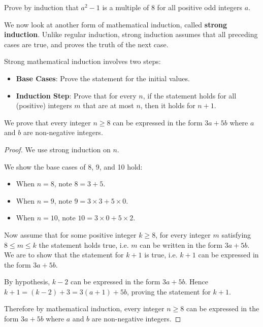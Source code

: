 \begin{exercise}
    Prove by induction that $a^2 - 1$ is a multiple of 8 for all positive odd integers $a$.
\end{exercise}

We now look at another form of mathematical induction, called \textbf{strong induction}. Unlike regular induction, strong induction assumes that all preceding cases are true, and proves the truth of the next case.

Strong mathematical induction involves two steps:
\begin{itemize}
    \item \textbf{Base Cases}: Prove the statement for the initial values.
    \item \textbf{Induction Step}: Prove that for every $n$, if the statement holds for all (positive) integers $m$ that are at most $n$, then it holds for $n + 1$.
\end{itemize}

\begin{example}
    We prove that every integer $n \geq 8$ can be expressed in the form $3a + 5b$ where $a$ and $b$ are non-negative integers.
    \begin{proof}
        We use strong induction on $n$.
        
        We show the base cases of 8, 9, and 10 hold:
        \begin{itemize}
            \item When $n = 8$, note $8 = 3 + 5$.
            \item When $n = 9$, note $9 = 3 \times 3 + 5 \times 0$.
            \item When $n = 10$, note $10 = 3 \times 0 + 5 \times 2$.
        \end{itemize}
        
        Now assume that for some positive integer $k \geq 8$, for every integer $m$ satisfying $8 \leq m \leq k$ the statement holds true, i.e. $m$ can be written in the form $3a + 5b$. We are to show that the statement for $k+1$ is true, i.e. $k+1$ can be expressed in the form $3a + 5b$.
        
        By hypothesis, $k - 2$ can be expressed in the form $3a+5b$. Hence $k+1 = (k-2) + 3 = 3(a+1) + 5b$, proving the statement for $k+1$.
        
        Therefore by mathematical induction, every integer $n \geq 8$ can be expressed in the form $3a + 5b$ where $a$ and $b$ are non-negative integers.
    \end{proof}
\end{example}

